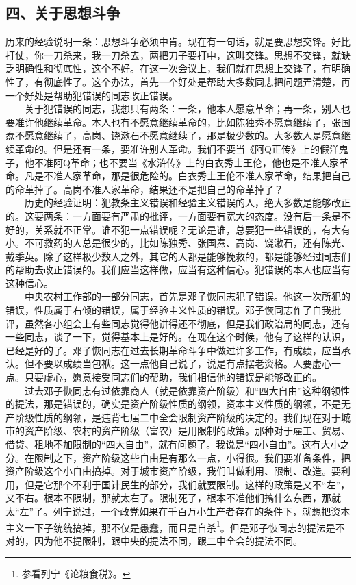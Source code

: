\documentclass[cn,11pt,chinese]{elegantbook}
\def\myformat#1{\hfil\hfil #1}
\begin{document}
\subsection*{\myformat{四、关于思想斗争}}
历来的经验说明一条：思想斗争必须中肯。现在有一句话，就是要思想交锋。好比打仗，你一刀杀来，我一刀杀去，两把刀子要打中，这叫交锋。思想不交锋，就缺乏明确性和彻底性，这个不好。在这一次会议上，我们就在思想上交锋了，有明确性了，有彻底性了。这个办法，首先一个好处是帮助大多数同志把问题弄清楚，再一个好处是帮助犯错误的同志改正错误。\\
　　关于犯错误的同志，我想只有两条：一条，他本人愿意革命；再一条，别人也要准许他继续革命。本人也有不愿意继续革命的，比如陈独秀不愿意继续了，张国焘不愿意继续了，高岗、饶漱石不愿意继续了，那是极少数的。大多数人是愿意继续革命的。但是还有一条，要准许别人革命。我们不要当《阿Q正传》上的假洋鬼子，他不准阿Q革命；也不要当《水浒传》上的白衣秀士王伦，他也是不准人家革命。凡是不准人家革命，那是很危险的。白衣秀士王伦不准人家革命，结果把自己的命革掉了。高岗不准人家革命，结果还不是把自己的命革掉了？\\
　　历史的经验证明：犯教条主义错误和经验主义错误的人，绝大多数是能够改正的。这要两条：一方面要有严肃的批评，一方面要有宽大的态度。没有后一条是不好的，关系就不正常。谁不犯一点错误呢？无论是谁，总要犯一些错误的，有大有小。不可救药的人总是很少的，比如陈独秀、张国焘、高岗、饶漱石，还有陈光、戴季英。除了这样极少数人之外，其它的人都是能够挽救的，都是能够经过同志们的帮助去改正错误的。我们应当这样做，应当有这种信心。犯错误的本人也应当有这种信心。\\
　　中央农村工作部的一部分同志，首先是邓子恢同志犯了错误。他这一次所犯的错误，性质属于右倾的错误，属于经验主义性质的错误。邓子恢同志作了自我批评，虽然各小组会上有些同志觉得他讲得还不彻底，但是我们政治局的同志，还有一些同志，谈了一下，觉得基本上是好的。在现在这个时候，他有了这样的认识，已经是好的了。邓子恢同志在过去长期革命斗争中做过许多工作，有成绩，应当承认。但不要以成绩当包袱。这一点他自己说了，说是有点摆老资格。人要虚心一点。只要虚心，愿意接受同志们的帮助，我们相信他的错误是能够改正的。\\
　　过去邓子恢同志有过依靠商人（就是依靠资产阶级）和“四大自由”这种纲领性的提法，那是错误的，确实是资产阶级性质的纲领，资本主义性质的纲领，不是无产阶级性质的纲领，是违背七届二中全会限制资产阶级的决定的。我们现在对于城市的资产阶级、农村的资产阶级（富农）是用限制的政策。那种对于雇工、贸易、借贷、租地不加限制的“四大自由”，就有问题了。我说是“四小自由”。这有大小之分。在限制之下，资产阶级这些自由是有那么一点，小得很。我们要准备条件，把资产阶级这个小自由搞掉。对于城市资产阶级，我们叫做利用、限制、改造。要利用，但是它那个不利于国计民生的部分，我们就要限制。这样的政策是又不“左”，又不右。根本不限制，那就太右了。限制死了，根本不准他们搞什么东西，那就太“左”了。列宁说过，一个政党如果在千百万小生产者存在的条件下，就想把资本主义一下子统统搞掉，那不仅是愚蠢，而且是自杀\footnote[3]{参看列宁《论粮食税》。}。但是邓子恢同志的提法是不对的，因为他不提限制，跟中央的提法不同，跟二中全会的提法不同。\\
\end{document}
